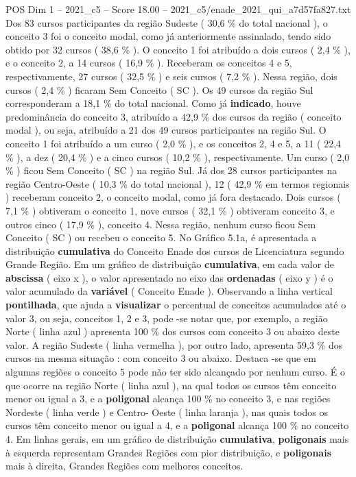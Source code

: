 \begin{textsample}{POS Dim 1 – 2021\_c5 – Score 18.00 – 2021\_c5/enade\_2021\_qui\_a7d57fa827.txt}
Dos 83 cursos participantes da região Sudeste ( 30,6 \% do total nacional ), o conceito 3 foi o conceito modal, como já anteriormente assinalado, tendo sido obtido por 32 cursos ( 38,6 \% ).
O conceito 1 foi atribuído a dois cursos ( 2,4 \% ), e o conceito 2, a 14 cursos ( 16,9 \% ).
Receberam os conceitos 4 e 5, respectivamente, 27 cursos ( 32,5 \% ) e seis cursos ( 7,2 \% ).
Nessa região, dois cursos ( 2,4 \% ) ficaram Sem Conceito ( SC ).
Os 49 cursos da região Sul corresponderam a 18,1 \% do total nacional.
Como já \textbf{indicado}, houve predominância do conceito 3, atribuído a 42,9 \% dos cursos da região ( conceito modal ), ou seja, atribuído a 21 dos 49 cursos participantes na região Sul.
O conceito 1 foi atribuído a um curso ( 2,0 \% ), e os conceitos 2, 4 e 5, a 11 ( 22,4 \% ), a dez ( 20,4 \% ) e a cinco cursos ( 10,2 \% ), respectivamente.
Um curso ( 2,0 \% ) ficou Sem Conceito ( SC ) na região Sul.
Já dos 28 cursos participantes na região Centro-Oeste ( 10,3 \% do total nacional ), 12 ( 42,9 \% em termos regionais ) receberam conceito 2, o conceito modal, como já fora destacado.
Dois cursos ( 7,1 \% ) obtiveram o conceito 1, nove cursos ( 32,1 \% ) obtiveram conceito 3, e outros cinco ( 17,9 \% ), conceito 4.
Nessa região, nenhum curso ficou Sem Conceito ( SC ) ou recebeu o conceito 5.
No Gráfico 5.1a, é apresentada a distribuição \textbf{cumulativa} do Conceito Enade dos cursos de Licenciatura segundo Grande Região.
Em um gráfico de distribuição \textbf{cumulativa}, em cada valor de \textbf{abscissa} ( eixo x ), o valor apresentado no eixo das \textbf{ordenadas} ( eixo y ) é o valor acumulado da \textbf{variável} ( Conceito Enade ).
Observando a linha vertical \textbf{pontilhada}, que ajuda a \textbf{visualizar} o percentual de conceitos acumulados até o valor 3, ou seja, conceitos 1, 2 e 3, pode -se notar que, por exemplo, a região Norte ( linha azul ) apresenta 100 \% dos cursos com conceito 3 ou abaixo deste valor.
A região Sudeste ( linha vermelha ), por outro lado, apresenta 59,3 \% dos cursos na mesma situação : com conceito 3 ou abaixo.
Destaca -se que em algumas regiões o conceito 5 pode não ter sido alcançado por nenhum curso.
É o que ocorre na região Norte ( linha azul ), na qual todos os cursos têm conceito menor ou igual a 3, e a \textbf{poligonal} alcança 100 \% no conceito 3, e nas regiões Nordeste ( linha verde ) e Centro- Oeste ( linha laranja ), nas quais todos os cursos têm conceito menor ou igual a 4, e a \textbf{poligonal} alcança 100 \% no conceito 4.
Em linhas gerais, em um gráfico de distribuição \textbf{cumulativa}, \textbf{poligonais} mais à esquerda representam Grandes Regiões com pior distribuição, e \textbf{poligonais} mais à direita, Grandes Regiões com melhores conceitos.

\end{textsample}
